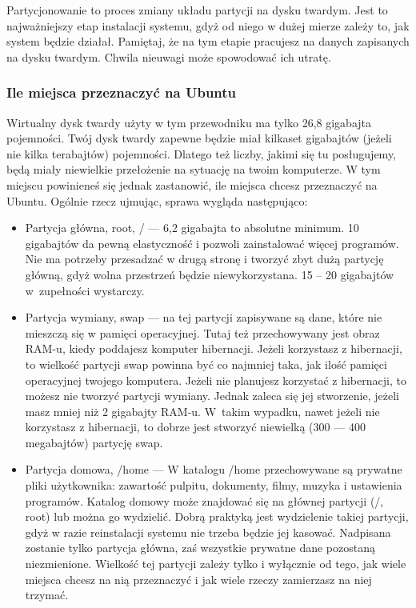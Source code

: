 \label{subsec:partycjonowanie}
Partycjonowanie to proces zmiany układu partycji na dysku twardym. Jest to najważniejszy etap instalacji systemu, gdyż od niego w dużej mierze zależy to, jak system będzie działał. Pamiętaj, że na tym etapie pracujesz na danych zapisanych na dysku twardym. Chwila nieuwagi może spowodować ich utratę.
\subsubsection{Ile miejsca przeznaczyć na Ubuntu}
\label{ile_miejsca}
Wirtualny dysk twardy użyty w tym przewodniku ma tylko 26,8 gigabajta pojemności. Twój dysk twardy zapewne będzie miał kilkaset gigabajtów (jeżeli nie kilka terabajtów) pojemności. Dlatego też liczby, jakimi się tu posługujemy, będą miały niewielkie przełożenie na sytuację na twoim komputerze. W tym miejscu powinieneś się jednak zastanowić, ile miejsca chcesz przeznaczyć na Ubuntu.
Ogólnie rzecz ujmując, sprawa wygląda następująco:
\begin{itemize}
\item \textcolor{ubuntu_orange}{Partycja główna, root, /} --- 6,2 gigabajta to absolutne minimum. 10 gigabajtów da pewną elastyczność i pozwoli zainstalować więcej programów. Nie ma potrzeby przesadzać w drugą stronę i tworzyć zbyt dużą partycję główną, gdyż wolna przestrzeń będzie niewykorzystana. 15 -- 20 gigabajtów w~zupełności wystarczy.
\item \textcolor{ubuntu_orange}{Partycja wymiany, swap} --- na tej partycji zapisywane są dane, które nie mieszczą się w pamięci operacyjnej. Tutaj też przechowywany jest obraz RAM-u, kiedy poddajesz komputer hibernacji. Jeżeli korzystasz z hibernacji, to wielkość partycji swap powinna być co najmniej taka, jak ilość pamięci operacyjnej twojego komputera. Jeżeli nie planujesz korzystać z hibernacji, to możesz nie tworzyć partycji wymiany. Jednak zaleca się jej stworzenie, jeżeli masz mniej niż 2 gigabajty RAM-u. W~takim wypadku, nawet jeżeli nie korzystasz z hibernacji, to dobrze jest stworzyć niewielką (300 --- 400 megabajtów) partycję swap.
\item \textcolor{ubuntu_orange}{Partycja domowa, /home} --- W katalogu /home przechowywane są prywatne pliki użytkownika: zawartość pulpitu, dokumenty, filmy, muzyka i ustawienia programów. Katalog domowy może znajdować się na głównej partycji (/, root) lub można go wydzielić. Dobrą praktyką jest wydzielenie takiej partycji, gdyż w razie reinstalacji systemu nie trzeba będzie jej kasować. Nadpisana zostanie tylko partycja główna, zaś wszystkie prywatne dane pozostaną niezmienione. Wielkość tej partycji zależy tylko i wyłącznie od tego, jak wiele miejsca chcesz na nią przeznaczyć i jak wiele rzeczy zamierzasz na niej trzymać. 
\end{itemize}
\clearpage

